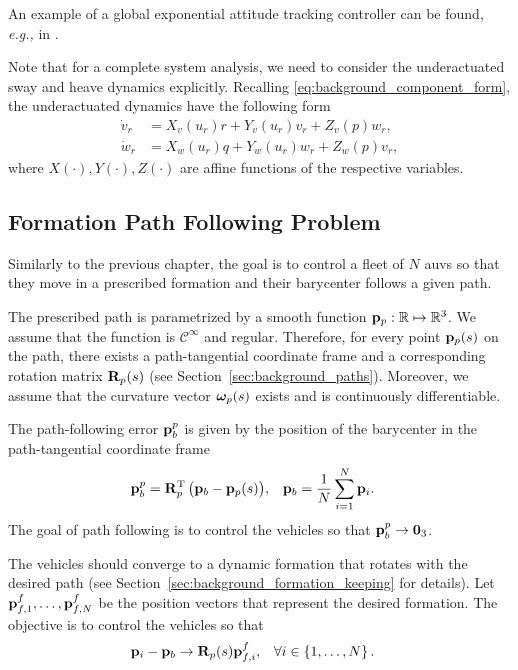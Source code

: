 An example of a global exponential attitude tracking controller can be found, \emph{e.g.,} in \cite{lee_global_2015}.

Note that for a complete system analysis, we need to consider the underactuated sway and heave dynamics explicitly. 
Recalling \eqref{eq:background_component_form}, the underactuated dynamics have the following form 
\begin{subequations}
    \begin{align}
        \dot{v}_r &= X_v(u_r)r + Y_v(u_r)v_r + Z_v(p)w_r, \\
        \dot{w}_r &= X_w(u_r)q + Y_w(u_r)w_r + Z_w(p)v_r,
        \label{eq:NSB_R_underactuated_dynamics}
    \end{align}
\end{subequations}
where $X(\cdot), Y(\cdot), Z(\cdot)$ are affine functions of the respective variables.

\subsection{Formation Path Following Problem}
\label{sec:NSB_R_objectives}

Similarly to the previous chapter, the goal is to control a fleet of $N$ \glspl{auv} so that they move in a prescribed formation and their barycenter follows a given path.

The prescribed path is parametrized by a smooth function $\mathbf{p}_p: \mathbb{R} \mapsto \mathbb{R}^3$.
We assume that the function is $\mathcal{C}^{\infty}$ and regular.
Therefore, for every point $\mathbf{p}_p(s)$ on the path, there exists a path-tangential coordinate frame and a corresponding rotation matrix $\mathbf{R}_p(s)$ (see Section~\ref{sec:background_paths}).
Moreover, we assume that the curvature vector $\bm{\omega}_p(s)$ exists and is continuously differentiable.

The path-following error $\mathbf{p}_b^p$ is given by the position of the barycenter in the path-tangential coordinate frame 
\begin{align}
    \mathbf{p}_b^p &= \mathbf{R}_p^{\mathrm{T}} \, \big(\mathbf{p}_b - \mathbf{p}_p(s)\big), &
    \mathbf{p}_b &= \frac{1}{N} \sum_{i=1}^N \mathbf{p}_i.
    \label{eq:NSB_R_barycenter}
\end{align}
The goal of path following is to control the vehicles so that $\mathbf{p}_b^p \rightarrow \mathbf{0}_3$.

The vehicles should converge to a dynamic formation that rotates with the desired path (see Section~\ref{sec:background_formation_keeping} for details).
Let $\mathbf{p}_{f,1}^f, \ldots, \mathbf{p}_{f,N}^f$ be the position vectors that represent the desired formation.
The objective is to control the vehicles so that
\begin{align}
    \mathbf{p}_i - \mathbf{p}_b &\rightarrow \mathbf{R}_p(s) \mathbf{p}_{f,i}^f, &
    \forall i &\in \left\{1, \ldots, N \right\}.
\end{align}


